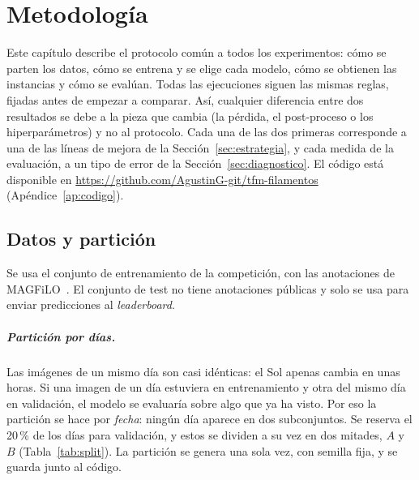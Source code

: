 
\chapter{Metodología}
\label{cap:metodologia}

Este capítulo describe el protocolo común a todos los experimentos: cómo
se parten los datos, cómo se entrena y se elige cada modelo, cómo se
obtienen las instancias y cómo se evalúan. Todas las ejecuciones siguen
las mismas reglas, fijadas antes de empezar a comparar. Así, cualquier
diferencia entre dos resultados se debe a la pieza que cambia (la
pérdida, el post-proceso o los hiperparámetros) y no al protocolo. Cada
una de las dos primeras corresponde a una de las líneas de mejora de la
Sección~\ref{sec:estrategia}, y cada medida de la evaluación, a un tipo
de error de la Sección~\ref{sec:diagnostico}. El código está disponible
en \url{https://github.com/AgustinG-git/tfm-filamentos}
(Apéndice~\ref{ap:codigo}).

\section{Datos y partición}
\label{sec:particion}

Se usa el conjunto de entrenamiento de la competición, con las
anotaciones de MAGFiLO~\cite{ahmadzadeh2024,kaggle2026}. El conjunto de
test no tiene anotaciones públicas y solo se usa para enviar
predicciones al \emph{leaderboard}.

\paragraph{Partición por días.} Las imágenes de un mismo día son casi
idénticas: el Sol apenas cambia en unas horas. Si una imagen de un día
estuviera en entrenamiento y otra del mismo día en validación, el modelo
se evaluaría sobre algo que ya ha visto. Por eso la partición se hace por
\emph{fecha}: ningún día aparece en dos subconjuntos. Se reserva el
20\,\% de los días para validación, y estos se dividen a su vez en dos
mitades, $A$ y $B$ (Tabla~\ref{tab:split}). La partición se genera una
sola vez, con semilla fija, y se guarda junto al código.

